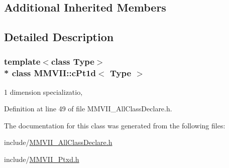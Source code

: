 \subsection*{Additional Inherited Members}


\subsection{Detailed Description}
\subsubsection*{template$<$class Type$>$\\*
class M\+M\+V\+I\+I\+::c\+Pt1d$<$ Type $>$}

1 dimension specializatio, 

Definition at line 49 of file M\+M\+V\+I\+I\+\_\+\+All\+Class\+Declare.\+h.



The documentation for this class was generated from the following files\+:\begin{DoxyCompactItemize}
\item 
include/\hyperlink{MMVII__AllClassDeclare_8h}{M\+M\+V\+I\+I\+\_\+\+All\+Class\+Declare.\+h}\item 
include/\hyperlink{MMVII__Ptxd_8h}{M\+M\+V\+I\+I\+\_\+\+Ptxd.\+h}\end{DoxyCompactItemize}

